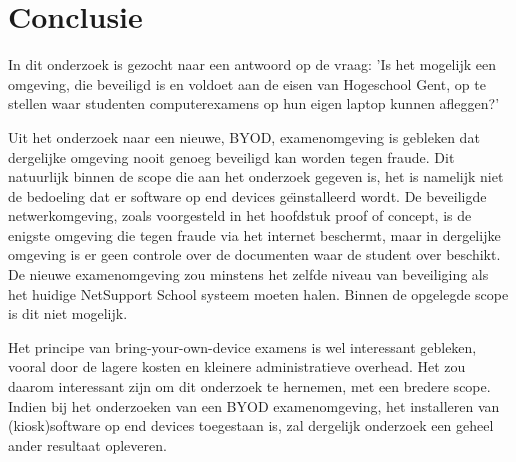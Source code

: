 
\chapter{Conclusie}
\label{ch:conclusie}



In dit onderzoek is gezocht naar een antwoord op de vraag: 'Is het mogelijk een omgeving, die beveiligd is en voldoet aan de eisen van Hogeschool Gent, op te stellen waar studenten computerexamens op hun eigen laptop kunnen afleggen?'

Uit het onderzoek naar een nieuwe, BYOD, examenomgeving is gebleken dat dergelijke omgeving nooit genoeg beveiligd kan worden tegen fraude. Dit natuurlijk binnen de scope die aan het onderzoek gegeven is, het is namelijk niet de bedoeling dat er software op end devices ge\"{\i}nstalleerd wordt. De beveiligde netwerkomgeving, zoals voorgesteld in het hoofdstuk proof of concept, is de enigste omgeving die tegen fraude via het internet beschermt, maar in dergelijke omgeving is er geen controle over de documenten waar de student over beschikt. De nieuwe examenomgeving zou minstens het zelfde niveau van beveiliging als het huidige NetSupport School systeem moeten halen. Binnen de opgelegde scope is dit niet mogelijk. 


Het principe van bring-your-own-device examens is wel interessant gebleken, vooral door de lagere kosten en kleinere administratieve overhead. Het zou daarom interessant zijn om dit onderzoek te hernemen, met een bredere scope. Indien bij het onderzoeken van een BYOD examenomgeving, het installeren van (kiosk)software op end devices toegestaan is, zal dergelijk onderzoek een geheel ander resultaat opleveren.




